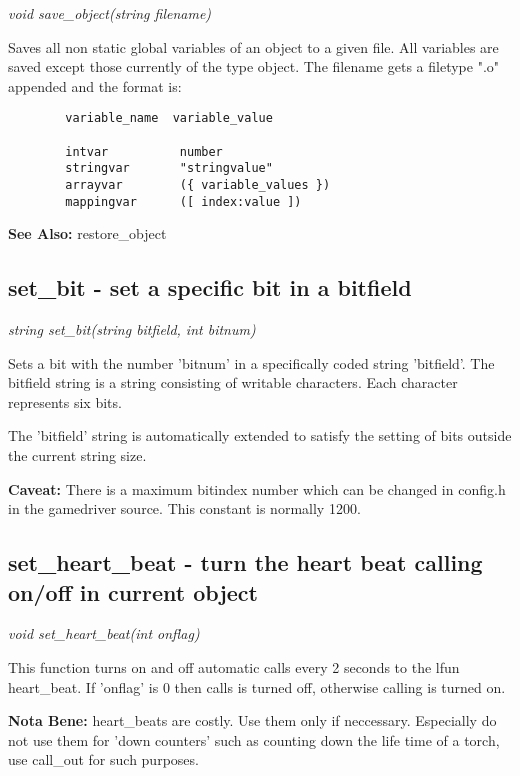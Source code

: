     {\em void save\_object(string filename)}

    Saves all non static global variables of an object to a given file.
    All variables are saved except those currently of the type object.
    The filename gets a filetype ".o" appended and the format is:

    \begin{verbatim}
        variable_name  variable_value

        intvar          number
        stringvar       "stringvalue"
        arrayvar        ({ variable_values })
        mappingvar      ([ index:value ])
    \end{verbatim}

    {\bf See Also: }    restore\_object


\subsection{set\_bit - set a specific bit in a bitfield}

    {\em string set\_bit(string bitfield, int bitnum)}

    Sets a bit with the number 'bitnum' in a specifically coded string
    'bitfield'. The bitfield string is a string consisting of writable
    characters. Each character represents six bits.

    The 'bitfield' string is automatically extended to satisfy the setting
    of bits outside the current string size.

    {\bf Caveat: }  There is a maximum bitindex number which can be changed in config.h
    in the gamedriver source. This constant is normally 1200.



\subsection{set\_heart\_beat - turn the heart beat calling on/off in current object}

    {\em void set\_heart\_beat(int onflag)}

    This function turns on and off automatic calls every 2 seconds to
    the lfun heart\_beat. If 'onflag' is 0 then calls is turned off, 
    otherwise calling is turned on. 

    {\bf Nota Bene: }   heart\_beats are costly. Use them only if neccessary. Especially
    do not use them for 'down counters' such as counting down the
    life time of a torch, use call\_out for such purposes.

